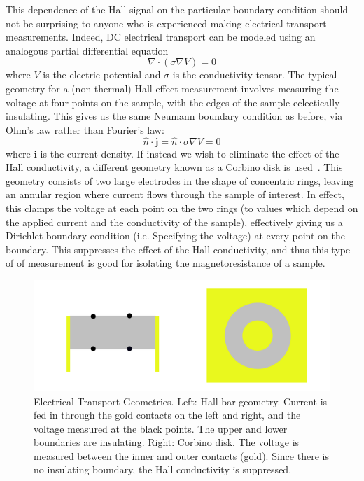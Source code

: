 \documentclass{thesis-umich}
\begin{document}
This dependence of the Hall signal on the particular boundary condition should
not be surprising to anyone who is experienced making electrical transport
measurements. Indeed, DC electrical transport can be modeled using an analogous
partial differential equation \[ \nabla \cdot (\sigma \nabla V) = 0 \] where
$V$ is the electric potential and $\sigma$ is the conductivity tensor. The
typical geometry for a (non-thermal) Hall effect measurement involves measuring
the voltage at four points on the sample, with the edges of the sample
eclectically insulating. This gives us the same Neumann boundary condition as
before, via Ohm's law rather than Fourier's law: \[ \hat{n} \cdot \mathbf{j} =
\hat{n} \cdot \sigma \nabla V = 0\] where $\mathbf{i}$ is the current density.
If instead we wish to eliminate the effect of the Hall conductivity, a
different geometry known as a Corbino disk is used~\cite{Eo2018}. This geometry consists of
two large electrodes in the shape of concentric rings, leaving an annular
region where current flows through the sample of interest. In effect, this
clamps the voltage at each point on the two rings (to values which depend on
the applied current and the conductivity of the sample), effectively giving us
a Dirichlet boundary condition (i.e. Specifying the voltage) at every point on the boundary. This suppresses
the effect of the Hall conductivity, and thus this type of of measurement is
good for isolating the magnetoresistance of a sample.

\begin{figure} \centering
	\includegraphics[width=\textwidth]{figures/ehall_geometry.pdf}
	\caption[Electrical Transport Geometries]{Electrical Transport
	Geometries. Left: Hall bar geometry. Current is fed in through the gold
contacts on the left and right, and the voltage measured at the black points.
The upper and lower boundaries are insulating. Right: Corbino disk. The voltage
is measured between the inner and outer contacts (gold). Since there is no
insulating boundary, the Hall conductivity is suppressed.} \end{figure}
\end{document}
